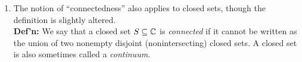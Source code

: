 \begin{enumerate}
\begin{enumerate}
\begin{problem}
			Consider the case where $\sqrt{x^2 + y^2} > 2$. Thus we have that:
			\begin{align*}
				\sqrt{x^2 + y^2} = 0\\
				\frac{\partial \sqrt{x^2 + y^2}}{\partial x} = \frac{\partial 0 }{\partial x }= 0\\
				\frac{\partial \sqrt{x^2 + y^2}}{\partial y} = \frac{\partial 0 }{\partial y }= 0
			\end{align*}
			The same applies for the the case where $|z|<1$, except where the term in our derivate is 1. 
		\end{problem}
		\item Notice that $u$ is not constant in $D$. Why doesn't this contradict Theorem 1 from Section 1.6?
		\begin{problem}
			This is because $u$ is not defined for $1 \le |z| \le 2$.
		\end{problem}
	\end{enumerate}
	
	
	\item The notion of ``connectedness'' also applies to closed sets, though the definition is slightly altered.\\
	\textbf{Def'n:} We say that a closed set $S\subseteq \mathbb{C}$ is \emph{connected} if it cannot be written as the union of two nonempty disjoint (nonintersecting) closed sets. A closed set is also sometimes called a \emph{continuum}.\\
	

\end{enumerate}
